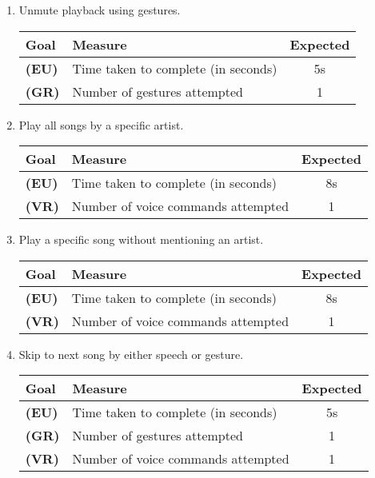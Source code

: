 \documentclass[12pt,letterpaper]{article}
\begin{document}
\begin{enumerate}
\item Unmute playback using gestures.
\begin{center}\begin{tabular}{l|l|c}
\textbf{Goal} & \textbf{Measure} & \textbf{Expected} \\
\hline
\textbf{(EU)} & Time taken to complete (in seconds) & 5s \\
\hline
\textbf{(GR)} & Number of gestures attempted & 1 \\
\hline
\end{tabular}\end{center}

\item Play all songs by a specific artist.
\begin{center}\begin{tabular}{l|l|c}
\textbf{Goal} & \textbf{Measure} & \textbf{Expected} \\
\hline
\textbf{(EU)} & Time taken to complete (in seconds) & 8s \\
\hline
\textbf{(VR)} & Number of voice commands attempted & 1 \\
\hline
\end{tabular}\end{center}


\item Play a specific song without mentioning an artist.
\begin{center}\begin{tabular}{l|l|c}
\textbf{Goal} & \textbf{Measure} & \textbf{Expected} \\
\hline
\textbf{(EU)} & Time taken to complete (in seconds) & 8s \\
\hline
\textbf{(VR)} & Number of voice commands attempted & 1 \\
\hline
\end{tabular}\end{center}


\item Skip to next song by either speech or gesture.
\begin{center}\begin{tabular}{l|l|c}
\textbf{Goal} & \textbf{Measure} & \textbf{Expected} \\
\hline
\textbf{(EU)} & Time taken to complete (in seconds) & 5s \\
\hline
\textbf{(GR)} & Number of gestures attempted & 1 \\
\hline
\textbf{(VR)} & Number of voice commands attempted & 1 \\
\hline
\end{tabular}\end{center}


\end{enumerate}
\end{document}
